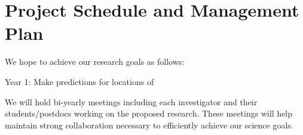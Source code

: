 \section{Project Schedule and Management Plan}

We hope to achieve our research goals as follows:

Year 1: Make predictions for locations of  

We will  hold bi-yearly meetings including each investigator and their students/postdocs working on the proposed research. These meetings will help maintain strong collaboration necessary to efficiently achieve our science goals.
